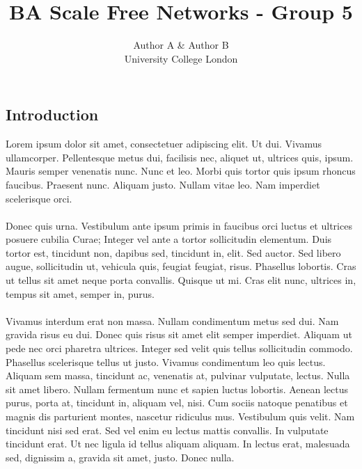 \documentclass[a0,final]{a0poster}
\title{BA Scale Free Networks - Group 5}
\author{Author A \& Author B\\
University College London}
\begin{document}
\hspace{-3cm}								%
\colorbox{boxcol}{							%
\begin{minipage}{1189mm}					%
\maketitle
\end{minipage}}
\vspace{1cm}

\begin{multicols}{3}							%
\raggedcolumns							%

\section*{Introduction}
Lorem ipsum dolor sit amet, consectetuer adipiscing elit. Ut dui. Vivamus ullamcorper. Pellentesque metus dui, facilisis nec, aliquet ut, ultrices quis, ipsum. Mauris semper venenatis nunc. Nunc et leo. Morbi quis tortor quis ipsum rhoncus faucibus. Praesent nunc. Aliquam justo. Nullam vitae leo. Nam imperdiet scelerisque orci.\\
\\
Donec quis urna. Vestibulum ante ipsum primis in faucibus orci luctus et ultrices posuere cubilia Curae; Integer vel ante a tortor sollicitudin elementum. Duis tortor est, tincidunt non, dapibus sed, tincidunt in, elit. Sed auctor. Sed libero augue, sollicitudin ut, vehicula quis, feugiat feugiat, risus. Phasellus lobortis. Cras ut tellus sit amet neque porta convallis. Quisque ut mi. Cras elit nunc, ultrices in, tempus sit amet, semper in, purus.\\
\\
Vivamus interdum erat non massa. Nullam condimentum metus sed dui. Nam gravida risus eu dui. Donec quis risus sit amet elit semper imperdiet. Aliquam ut pede nec orci pharetra ultrices. Integer sed velit quis tellus sollicitudin commodo. Phasellus scelerisque tellus ut justo. Vivamus condimentum leo quis lectus. Aliquam sem massa, tincidunt ac, venenatis at, pulvinar vulputate, lectus. Nulla sit amet libero. Nullam fermentum nunc et sapien luctus lobortis. Aenean lectus purus, porta at, tincidunt in, aliquam vel, nisi. Cum sociis natoque penatibus et magnis dis parturient montes, nascetur ridiculus mus. Vestibulum quis velit. Nam tincidunt nisi sed erat. Sed vel enim eu lectus mattis convallis. In vulputate tincidunt erat. Ut nec ligula id tellus aliquam aliquam. In lectus erat, malesuada sed, dignissim a, gravida sit amet, justo. Donec nulla.



\end{multicols}
\end{document}
